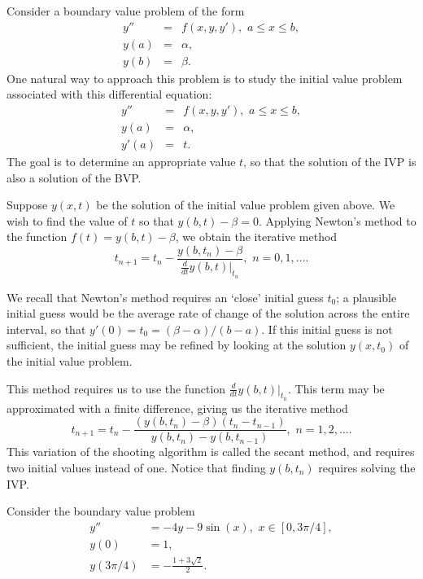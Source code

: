 \label{lab:Shooting}

Consider a boundary value problem of the form 
\begin{eqnarray*}
y'' &=& f(x,y,y'), \,\, a \leq x \leq b, \\
y(a) &=& \alpha, \\
y(b) &=& \beta. 
\end{eqnarray*}
One natural way to approach this problem is to study the initial value problem associated with this differential equation: 
\begin{eqnarray*}
y'' &=& f(x,y,y'), \,\, a \leq x \leq b, \\
y(a) &=& \alpha, \\
y'(a) &=& t. 
\end{eqnarray*}
The goal is to determine an  appropriate value $t$, so that the solution of the IVP is also a solution of the BVP. 

Suppose $y(x,t)$ be the solution of the initial value problem given above. We wish to find the value of $t$ so that 
$y(b,t) - \beta = 0$. 
Applying Newton's method to the function $f(t) = y(b,t) - \beta$, we obtain the iterative method 
\[t_{n+1} = t_n - \frac{ y(b,t_n) - \beta}{\frac{d}{dt} \left.y(b,t)\right|_{t_n} }, \,\, n = 0,1,\hdots .\]

We recall that Newton's method requires an `close' initial guess $t_0$; a plausible initial guess would be the average rate of change of the solution across the entire interval, so that $y'(0) = t_0 =  (\beta - \alpha)/(b-a)$. If this initial guess is not sufficient, the initial guess may be refined by looking at the solution $y(x,t_0)$ of the initial value problem.

This method requires us to use the function $\frac{d}{dt} \left.y(b,t)\right|_{t_n}$. This term may be approximated with a finite difference, giving us the iterative method
\[t_{n+1} = t_n - \frac{ (y(b,t_n) - \beta)(t_n - t_{n-1})}{y(b,t_n) - y(b,t_{n-1}) }, \,\, n = 1, 2,\hdots .\]
This variation of the shooting algorithm is called the secant method, and requires two initial values instead of one. Notice that finding $y(b,t_n)$ requires solving the IVP.

Consider the boundary value problem
\begin{equation}
\begin{split}
\label{bvp1}
y'' &= -4y -9\sin(x), \,\, x \in [0,3\pi/4],\\
y(0) &= 1, \\
y(3 \pi/4) &= -\frac{1+3\sqrt{2}}{2}.
\end{split}
\end{equation}

